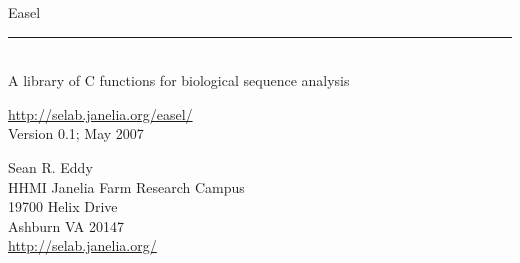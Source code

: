 \begin{titlepage}
{\Large

\vspace*{\fill}

\noindent
{\Huge{Easel}} \\ 
\rule[2pt]{\textwidth}{1pt} \\
\hspace*{\fill} {\large {A library of C functions for
    biological sequence analysis} \\ }

\vspace*{\fill}

\begin{center}
\url{http://selab.janelia.org/easel/}\\
Version 0.1; May 2007 \\ 

\vspace*{\fill}

Sean R. Eddy\\
HHMI Janelia Farm Research Campus\\
19700 Helix Drive\\
Ashburn VA 20147\\
\url{http://selab.janelia.org/}\\
\end{center}

\vspace*{\fill}
}
\end{titlepage}
